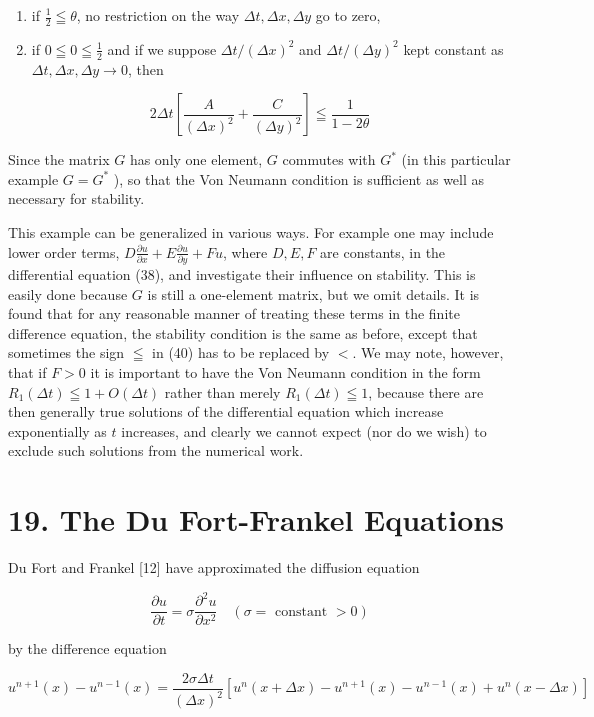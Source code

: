 \documentclass[10pt]{article}
\begin{document}
\begin{enumerate}
  \item if \(\frac{1}{2} \leqq \theta\), no restriction on the way \(\Delta t, \Delta x, \Delta y\) go to zero,
  \item if \(0 \leqq 0 \leqq \frac{1}{2}\) and if we suppose \(\Delta t /(\Delta x)^{2}\) and \(\Delta t /(\Delta y)^{2}\) kept constant as \(\Delta t, \Delta x, \Delta y \rightarrow 0\), then
\end{enumerate}

\[
2 \Delta t\left[\frac{A}{(\Delta x)^{2}}+\frac{C}{(\Delta y)^{2}}\right] \leqq \frac{1}{1-2 \theta}
\]

Since the matrix \(G\) has only one element, \(G\) commutes with \(G^{*}\) (in this particular example \(G=G^{*}\) ), so that the Von Neumann condition is sufficient as well as necessary for stability.

This example can be generalized in various ways. For example one may include lower order terms, \(D \frac{\partial u}{\partial x}+E \frac{\partial u}{\partial y}+F u\), where \(D, E, F\) are constants, in the differential equation (38), and investigate their influence on stability. This is easily done because \(G\) is still a one-element matrix, but we omit details. It is found that for any reasonable manner of treating these terms in the finite difference equation, the stability condition is the same as before, except that sometimes the sign \(\leqq\) in (40) has to be replaced by \(<\). We may note, however, that if \(F>0\) it is important to have the Von Neumann condition in the form \(R_{1}(\Delta t) \leqq 1+O(\Delta t)\) rather than merely \(R_{1}(\Delta t) \leqq 1\), because there are then generally true solutions of the differential equation which increase exponentially as \(t\) increases, and clearly we cannot expect (nor do we wish) to exclude such solutions from the numerical work.

\section*{19. The Du Fort-Frankel Equations}
Du Fort and Frankel [12] have approximated the diffusion equation

\[
\frac{\partial u}{\partial t}=\sigma \frac{\partial^{2} u}{\partial x^{2}} \quad(\sigma=\text { constant }>0)
\]

by the difference equation

\[
u^{n+1}(x)-u^{n-1}(x)=\frac{2 \sigma \Delta t}{(\Delta x)^{2}}\left[u^{n}(x+\Delta x)-u^{n+1}(x)-u^{n-1}(x)+u^{n}(x-\Delta x)\right]
\]
\end{document}
